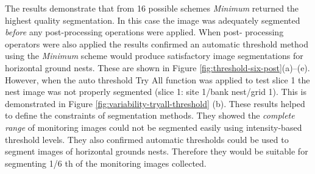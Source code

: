 The results demonstrate that from 16 possible schemes \emph{Minimum} returned the highest quality segmentation. In this case the image was adequately segmented \emph{before} any post-processing operations were applied. When post- processing operators were also applied the results confirmed an automatic threshold method using the \emph{Minimum} scheme would produce satisfactory image segmentations for horizontal ground nests. These are shown in Figure \ref {fig:threshold-six-post}(a)--(e). However, when the auto threshold {Try All} function was applied to test slice 1  the nest image was not properly segmented (slice 1: site 1/bank nest/grid 1). This is demonstrated in Figure \ref{fig:variability-tryall-threshold} (b). These results helped to define the constraints of segmentation methods. They showed the \emph{complete range} of monitoring images could not be segmented easily using intensity-based threshold levels. They also confirmed automatic thresholds could be used to segment images of horizontal grounds nests. Therefore they would be suitable for segmenting 1/6 {\scriptsize {th}} of the monitoring images collected.

